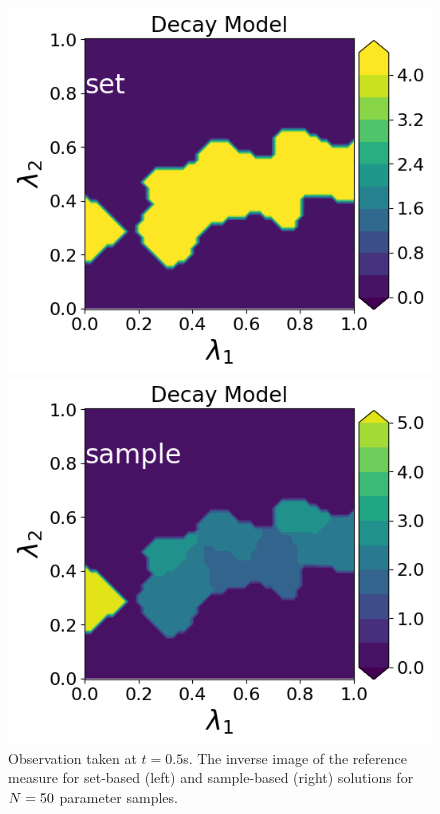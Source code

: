 \begin{figure}
\begin{minipage}{.475\textwidth}
\includegraphics[width=\linewidth]{examples/fig_decay_q2/DecayModel--set_N50_em.png}
\end{minipage}
\begin{minipage}{.475\textwidth}
\includegraphics[width=\linewidth]{examples/fig_decay_q2/DecayModel--sample_N50_mc.png}
\end{minipage}
\caption{Observation taken at $t=0.5$s. The inverse image of the reference measure for set-based (left) and sample-based (right) solutions for $N=50$ parameter samples.}
\label{fig:heatrod-sol-ex2}
\end{figure}


